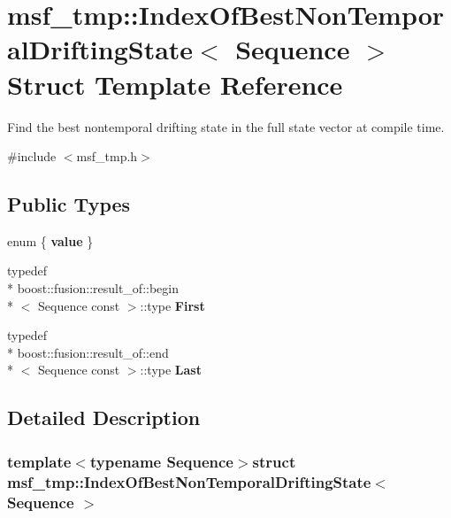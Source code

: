 \hypertarget{structmsf__tmp_1_1IndexOfBestNonTemporalDriftingState}{\section{msf\-\_\-tmp\-:\-:Index\-Of\-Best\-Non\-Temporal\-Drifting\-State$<$ Sequence $>$ Struct Template Reference}
\label{structmsf__tmp_1_1IndexOfBestNonTemporalDriftingState}
}


Find the best nontemporal drifting state in the full state vector at compile time.  




{\ttfamily \#include $<$msf\-\_\-tmp.\-h$>$}

\subsection*{Public Types}
\begin{DoxyCompactItemize}
\item 
enum \{ {\bfseries value}
 \}
\item 
\hypertarget{structmsf__tmp_1_1IndexOfBestNonTemporalDriftingState_a9f25e8cd8a466ed4bc97cd51b6a953e0}{typedef \\*
boost\-::fusion\-::result\-\_\-of\-::begin\\*
$<$ Sequence const  $>$\-::type {\bfseries First}}\label{structmsf__tmp_1_1IndexOfBestNonTemporalDriftingState_a9f25e8cd8a466ed4bc97cd51b6a953e0}

\item 
\hypertarget{structmsf__tmp_1_1IndexOfBestNonTemporalDriftingState_a66dd8d7ca1fbe97b50c94896293c952f}{typedef \\*
boost\-::fusion\-::result\-\_\-of\-::end\\*
$<$ Sequence const  $>$\-::type {\bfseries Last}}\label{structmsf__tmp_1_1IndexOfBestNonTemporalDriftingState_a66dd8d7ca1fbe97b50c94896293c952f}

\end{DoxyCompactItemize}


\subsection{Detailed Description}
\subsubsection*{template$<$typename Sequence$>$struct msf\-\_\-tmp\-::\-Index\-Of\-Best\-Non\-Temporal\-Drifting\-State$<$ Sequence $>$}

